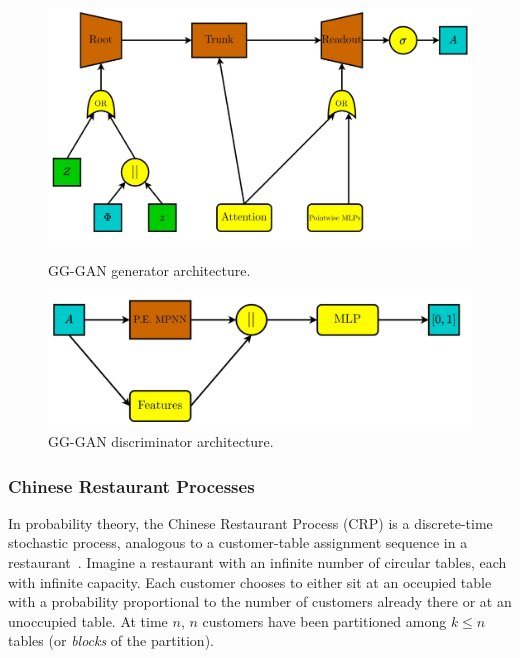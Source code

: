 \begin{figure}
    \centering
    \begin{minipage}{0.475\textwidth}
    \centering
    \includegraphics[width=\textwidth]{figures/gggcrp/gg_gan_g.pdf}
    \caption{GG-GAN generator architecture.}
    \label{fig:gg_gan_g}    
    \end{minipage}
    \hfill
    \begin{minipage}{0.475\textwidth}
    \centering
    \includegraphics[width=\textwidth]{figures/gggcrp/gg_gan_d.pdf}
    \caption{GG-GAN discriminator architecture.}
    \label{fig:gg_gan_d}    
    \end{minipage}
\end{figure}

\subsubsection{Chinese Restaurant Processes}
In probability theory, the Chinese Restaurant Process (CRP) is a discrete-time stochastic process, analogous to a customer-table assignment sequence in a restaurant~\cite{aldous_exchangeability_1985}. Imagine a restaurant with an infinite number of circular tables, each with infinite capacity. Each customer chooses to either sit at an occupied table with a probability proportional to the number of customers already there or at an unoccupied table. At time $n$, $n$ customers have been partitioned among $k \leq n$ tables (or \emph{blocks} of the partition).

